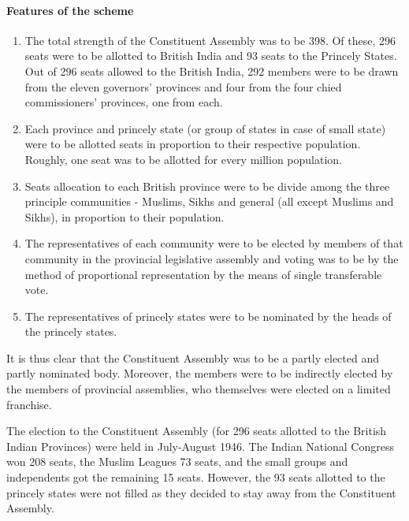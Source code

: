 \paragraph{Features of the scheme}
\begin{enumerate}
  \item The total strength of the Constituent Assembly was to be 398. Of these, 296 seats were to be allotted to British India and 93 seats to the Princely States. Out of 296 seats allowed to the British India, 292 members were to be drawn from the eleven governors' provinces and four from the four chied commissioners' provinces, one from each.
  \item Each province and princely state (or group of states in case of small state) were to be allotted seats in proportion to their respective population. Roughly, one seat was to be allotted for every million population.
  \item Seats allocation to each British province were to be divide among the three principle communities - Muslims, Sikhs and general (all except Muslims and Sikhs), in proportion to their population.
  \item The representatives of each community were to be elected by members of that community in the provincial legislative assembly and voting was to be by the method of proportional representation by the means of single transferable vote.
  \item The representatives of princely states were to be nominated by the heads of the princely states.
\end{enumerate}

It is thus clear that the Constituent Assembly was to be a partly elected and partly nominated body. Moreover, the members were to be indirectly elected by the members of provincial assemblies, who themselves were elected on a limited franchise.

The election to the Constituent Assembly (for 296 seats allotted to the British Indian Provinces) were held in July-August 1946. The Indian National Congress won 208 seats, the Muslim Leagues 73 seats, and the small groups and independents got the remaining 15 seats. However, the 93 seats allotted to the princely states were not filled as they decided to stay away from the Constituent Assembly.


